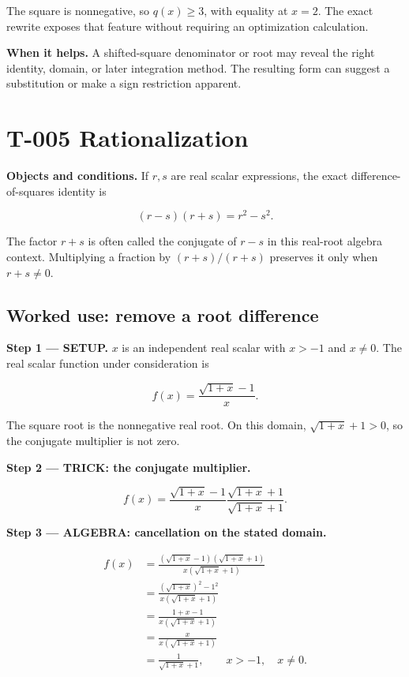 \documentclass[11pt,oneside,openany]{book}
\begin{document}
The square is nonnegative, so \(q(x)\geq3\), with equality at \(x=2\). The exact
rewrite exposes that feature without requiring an optimization calculation.

\textbf{When it helps.} A shifted-square denominator or root may reveal the right
identity, domain, or later integration method. The resulting form can suggest a substitution or make a sign restriction apparent.

\section{T-005 Rationalization}

\textbf{Objects and conditions.} If \(r,s\) are real scalar expressions, the exact
difference-of-squares identity is

\[
(r-s)(r+s)=r^2-s^2.
\]

The factor \(r+s\) is often called the conjugate of \(r-s\) in this real-root
algebra context. Multiplying a fraction by \((r+s)/(r+s)\) preserves it only when
\(r+s\ne0\).

\subsection{Worked use: remove a root difference}

\textbf{Step 1 --- SETUP.} \(x\) is an independent real scalar with \(x>-1\) and \(x\ne0\).
The real scalar function under consideration is

\[
f(x)=\frac{\sqrt{1+x}-1}{x}.
\]

The square root is the nonnegative real root. On this domain,
\(\sqrt{1+x}+1>0\), so the conjugate multiplier is not zero.

\begingroup\color{TrickPurple}
\textbf{Step 2 --- TRICK: the conjugate multiplier.}

\[
f(x)=\frac{\sqrt{1+x}-1}{x}
\frac{\sqrt{1+x}+1}{\sqrt{1+x}+1}.
\]

\endgroup
\begingroup\color{TrickPurple}
\textbf{Step 3 --- ALGEBRA: cancellation on the stated domain.}

\[
\begin{aligned}
f(x)&=\frac{(\sqrt{1+x}-1)(\sqrt{1+x}+1)}{x(\sqrt{1+x}+1)}\\
&=\frac{(\sqrt{1+x})^2-1^2}{x(\sqrt{1+x}+1)}\\
&=\frac{1+x-1}{x(\sqrt{1+x}+1)}\\
&=\frac{x}{x(\sqrt{1+x}+1)}\\
&=\frac1{\sqrt{1+x}+1},\qquad x>-1,\quad x\ne0.
\end{aligned}
\]
\end{document}
